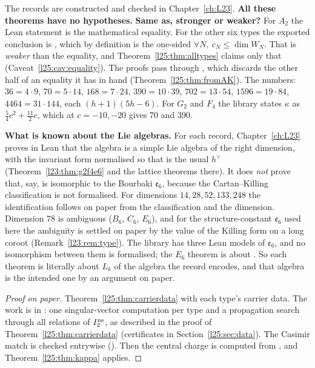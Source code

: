 \begin{dictionary}
The  records are constructed and checked in Chapter~\ref{ch:L23}. \textbf{All these theorems have no
hypotheses.} \textbf{Same as, stronger or weaker?} For $A_2$ the Lean statement is the mathematical equality. For the
other six types the exported conclusion is , which by definition is the one-sided
$\forall N,\ c_N\le\dim W_N$. That is \emph{weaker} than the equality, and Theorem~\ref{l25:thm:alltypes} claims only
that (Caveat~\ref{l25:cav:equality}). The proofs pass through , which discards
the other half of an equality it has in hand (Theorem~\ref{l25:thm:fromAK}). The numbers: $36=4\cdot9$, $70=5\cdot14$,
$168=7\cdot24$, $390=10\cdot39$, $702=13\cdot54$, $1596=19\cdot84$, $4464=31\cdot144$, each $(h+1)(5h-6)$. For $G_2$ and
$F_4$ the library states $\kappa$ as $\frac54c^2+\frac{11}2c$, which at $c=-10,-20$ gives $70$ and $390$.

\textbf{What is known about the Lie algebras.} For each record, Chapter~\ref{ch:L23} proves in Lean that the
algebra is a simple Lie algebra of the right dimension, with the invariant form normalised so that  is the
usual $h^\vee$ (Theorem~\ref{l23:thm:g2f4e6} and the lattice theorems there). It does \emph{not} prove that, say,
 is isomorphic to the Bourbaki $\mathfrak e_6$, because the Cartan--Killing classification is not
formalised. For dimensions $14,28,52,133,248$ the identification follows on paper from the classification and the
dimension. Dimension $78$ is ambiguous ($B_6$, $C_6$, $E_6$), and for the structure-constant $\mathfrak e_6$ used here
the ambiguity is settled on paper by the value of the Killing form on a long coroot (Remark~\ref{l23:rem:type}). The
library has three Lean models of $\mathfrak e_6$, and no isomorphism between them is formalised; the $E_6$ theorem is
about . So each theorem is literally about $L_k$ of the algebra the record encodes, and that algebra is
the intended one by an argument on paper.\end{dictionary}
\begin{proof}[Proof on paper]
Theorem~\ref{l25:thm:carrierdata} with each type's carrier data. The work is in : one singular-vector
computation per type and a propagation search through all relations of $I_2^{\rm ns}$, as described in the proof of
Theorem~\ref{l25:thm:carrierdata} (certificates in Section~\ref{l25:sec:data}). The Casimir match  is checked
entrywise (). Then the central charge is computed from , and
Theorem~\ref{l25:thm:kappa} applies.
\end{proof}
